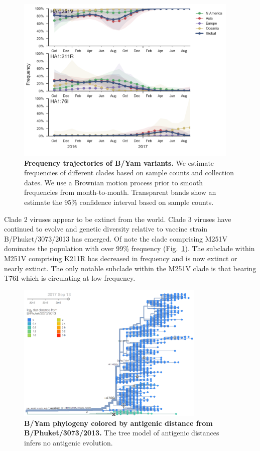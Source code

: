 \documentclass[11pt,oneside,letterpaper]{article}
\newcommand{\FIG}[1]{Fig.~\ref{#1}}
\begin{document}
\clearpage
\begin{figure}[H]
  \centering
  \includegraphics[width=0.95\textwidth]{../figures/sep-2017/yam_mutations.png}
  \caption{\textbf{Frequency trajectories of B/Yam variants.}
  We estimate frequencies of different clades based on sample counts and collection dates.
  We use a Brownian motion process prior to smooth frequencies from month-to-month.
  Transparent bands show an estimate the 95\% confidence interval based on sample counts.
  }
  \label{yam_mutations}
\end{figure}
Clade 2 viruses appear to be extinct from the world. Clade 3 viruses
have continued to evolve and genetic diversity relative to vaccine
strain B/Phuket/3073/2013 has emerged. Of note the clade comprising
M251V dominates the population with over 99\% frequency (\FIG{yam_mutations}). The subclade
within M251V comprising K211R has decreased in frequency and is now
extinct or nearly extinct. The only notable subclade within the M251V
clade is that bearing T76I which is circulating at low frequency.


\begin{figure}[H]
  \centering
  \includegraphics[width=0.8\textwidth]{../figures/sep-2017/yam_tree_titer_model.png}
  \caption{\textbf{B/Yam phylogeny colored by antigenic distance from B/Phuket/3073/2013.} The tree model of antigenic distances infers no antigenic evolution.
  }
  \label{yam_tree_titer_model}
\end{figure}
\end{document}
